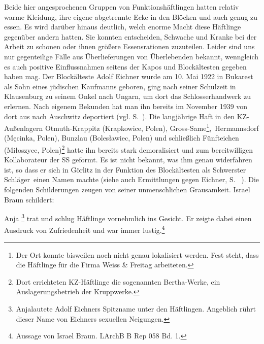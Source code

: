 \documentclass[a4paper,12pt,ngerman,
]{nisebook}
\begin{document}
Beide hier angesprochenen Gruppen von Funktionshäftlingen hatten relativ warme Kleidung, ihre eigene abgetrennte Ecke in den Blöcken und auch genug zu essen. Es wird da\-rüber hinaus deutlich, welch enorme Macht diese Häftlinge gegenüber andern hatten. Sie konnten entscheiden, Schwache und Kranke bei der Arbeit zu schonen oder ihnen größere Essensrationen zuzuteilen. Leider sind uns nur gegenteilige Fälle aus Überlieferungen von Überlebenden bekannt, wenngleich es auch positive Einflussnahmen seitens der Kapos und Blockältesten gegeben haben mag.
\newline
Der Blockälteste\label{eichner} Adolf Eichner wurde am 10. Mai 1922 in Bukarest als Sohn eines jüdischen Kaufmanns geboren, ging nach seiner Schulzeit in Klausenburg zu seinem Onkel nach Ungarn, um dort das Schlosserhandwerk zu erlernen. Nach eigenem Bekunden hat man ihn bereits im November 1939 von dort aus nach Auschwitz deportiert (vgl. S.~\pageref{ungarn}). Die langjährige Haft in den KZ-Außenlagern Otmuth-Krappitz (Krapkowice, Polen), Gross-Same\footnote{Der Ort konnte bisweilen noch nicht genau lokalisiert werden. Fest steht, dass die Häftlinge für die Firma Weiss \& Freitag arbeiteten.},~Hermannsdorf (Męcinka, Polen), Bunzlau (Boles\l awiec, Polen) und schließlich Fünfteichen (Mi\l oszyce, Polen)\footnote{Dort errichteten KZ-Häftlinge die sogenannten \glqq Bertha-Werke\grqq, ein Auslagerungsbetrieb der Kruppwerke.} hatte ihn bereits stark demoralisiert und zum bereitwilligen Kollaborateur der SS geformt. Es ist nicht bekannt, was ihm genau widerfahren ist, so dass er sich in Görlitz in der Funktion des Blockältesten als \glqq Schwerster Schläger\grqq~einen Namen machte (siehe auch Ermittlungen gegen Eichner, S. ~\pageref{eichner_ahndung}). Die folgenden Schilderungen zeugen von seiner unmenschlichen Grausamkeit. Israel Braun schildert:\label{turnen}
\begin{leftbar}
Anja \footnote{\glqq Anja\grqq lautete Adolf Eichners Spitzname unter den Häftlingen. Angeblich rührt dieser Name von Eichners sexuellen Neigungen.} trat und schlug Häftlinge vornehmlich ins Gesicht. Er zeigte dabei einen Ausdruck von Zufriedenheit und war immer lustig.\footnote{Aussage von Israel Braun. LArchB B Rep 058 Bd. 1.}
\end{leftbar}
\end{document}
